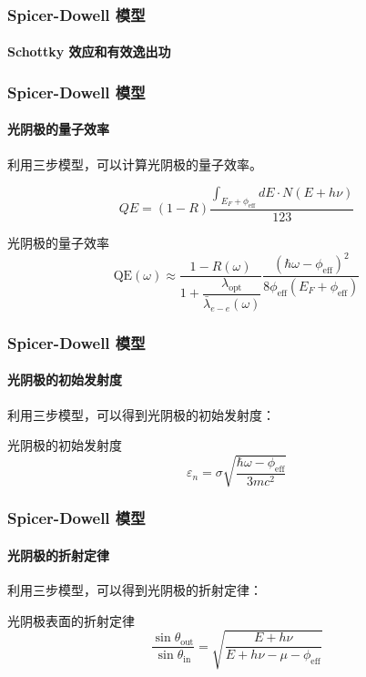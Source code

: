 \documentclass[ignorenonframetext, t]{beamer}
\begin{document}
\begin{frame}
	\frametitle{Spicer-Dowell 模型}
	\framesubtitle{Schottky 效应和有效逸出功}
\end{frame}

\begin{frame}
	\frametitle{Spicer-Dowell 模型}
	\framesubtitle{光阴极的量子效率}
	利用三步模型，可以计算光阴极的量子效率。
	\begin{derivation}
	\[QE = (1-R)\frac{\int_{E_F+\phi_{\mathrm{eff}}}dE\cdot N(E+h\nu)}{123}\]
	\end{derivation}
	\begin{formula}{光阴极的量子效率}
	\[
	\mathrm{QE}(\omega) \approx\dfrac{1-R(\omega)}{1+\dfrac{\lambda_{\mathrm{opt}}}{\bar{\lambda}_{e-e}(\omega)}}\frac{(\hbar\omega-\phi_{\mathrm{eff}})^2}{8\phi_{\mathrm{eff}}(E_F+\phi_{\mathrm{eff}})}
	\]
	\end{formula}
\end{frame}

\begin{frame}
	\frametitle{Spicer-Dowell 模型}
	\framesubtitle{光阴极的初始发射度}
	利用三步模型，可以得到光阴极的初始发射度：
	\begin{formula}{光阴极的初始发射度}
	\[
	\varepsilon_{n} =\sigma\sqrt{\dfrac{\hbar\omega-\phi_{\mathrm{eff}}}{3mc^2}}
	\]
	\end{formula}
\end{frame}

\begin{frame}
	\frametitle{Spicer-Dowell 模型}
	\framesubtitle{光阴极的折射定律}
	利用三步模型，可以得到光阴极的折射定律：
	\begin{formula}{光阴极表面的折射定律}
	\[
	\frac{\sin\theta_\mathrm{out}}{\sin\theta_\mathrm{in}}=\sqrt{\frac{E+h\nu}{E+h\nu-\mu-\phi_\mathrm{eff}}}
	\]
	\end{formula}
\end{frame}
\end{document}
